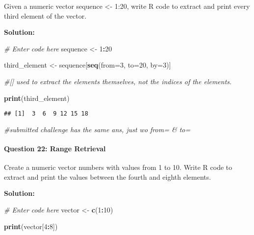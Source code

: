 \documentclass[
]{article}
\newenvironment{Shaded}{\begin{snugshade}}{\end{snugshade}}
\newcommand{\AttributeTok}[1]{\textcolor[rgb]{0.13,0.29,0.53}{#1}}
\newcommand{\CommentTok}[1]{\textcolor[rgb]{0.56,0.35,0.01}{\textit{#1}}}
\newcommand{\DecValTok}[1]{\textcolor[rgb]{0.00,0.00,0.81}{#1}}
\newcommand{\FunctionTok}[1]{\textcolor[rgb]{0.13,0.29,0.53}{\textbf{#1}}}
\newcommand{\NormalTok}[1]{#1}
\newcommand{\OtherTok}[1]{\textcolor[rgb]{0.56,0.35,0.01}{#1}}
\newcommand{\SpecialCharTok}[1]{\textcolor[rgb]{0.81,0.36,0.00}{\textbf{#1}}}
\begin{document}
Given a numeric vector sequence \textless- 1:20, write R code to extract
and print every third element of the vector.

\textbf{Solution:}

\begin{Shaded}
\begin{Highlighting}[]
\CommentTok{\# Enter code here}
\NormalTok{sequence }\OtherTok{\textless{}{-}} \DecValTok{1}\SpecialCharTok{:}\DecValTok{20}

\NormalTok{third\_element }\OtherTok{\textless{}{-}}\NormalTok{ sequence[}\FunctionTok{seq}\NormalTok{(}\AttributeTok{from=}\DecValTok{3}\NormalTok{, }\AttributeTok{to=}\DecValTok{20}\NormalTok{, }\AttributeTok{by=}\DecValTok{3}\NormalTok{)]}

\CommentTok{\#[] used to extract the elements themselves, not the indices of the elements.}

\FunctionTok{print}\NormalTok{(third\_element)}
\end{Highlighting}
\end{Shaded}

\begin{verbatim}
## [1]  3  6  9 12 15 18
\end{verbatim}

\begin{Shaded}
\begin{Highlighting}[]
\CommentTok{\#submitted challenge has the same ans, just wo from= \& to=}
\end{Highlighting}
\end{Shaded}

\hypertarget{question-22-range-retrieval}{%
\paragraph{Question 22: Range
Retrieval}\label{question-22-range-retrieval}}

Create a numeric vector numbers with values from 1 to 10. Write R code
to extract and print the values between the fourth and eighth elements.

\textbf{Solution:}

\begin{Shaded}
\begin{Highlighting}[]
\CommentTok{\# Enter code here}
\NormalTok{vector }\OtherTok{\textless{}{-}} \FunctionTok{c}\NormalTok{(}\DecValTok{1}\SpecialCharTok{:}\DecValTok{10}\NormalTok{)}

\FunctionTok{print}\NormalTok{(vector[}\DecValTok{4}\SpecialCharTok{:}\DecValTok{8}\NormalTok{])}
\end{Highlighting}
\end{Shaded}
\end{document}
